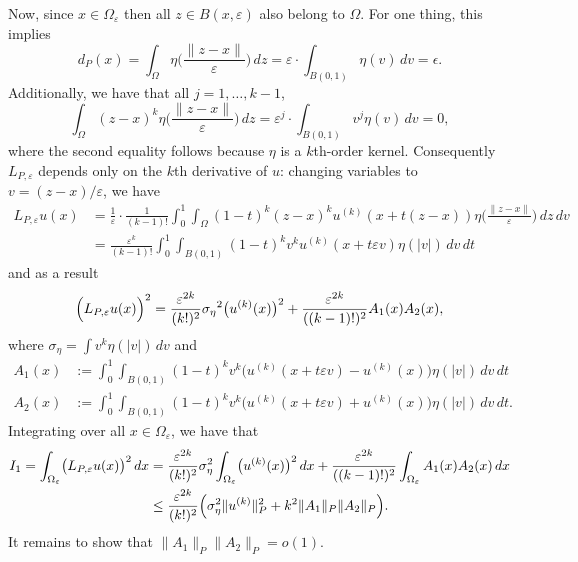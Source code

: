 \documentclass{article}
\newcommand{\1}{\mathbf{1}}
\theoremstyle{definition}
\theoremstyle{remark}
\begin{document}
Now, since $x \in \Omega_{\varepsilon}$ then all $z \in B(x,\varepsilon)$ also belong to $\Omega$. For one thing, this implies
\begin{equation*}
d_P(x) = \int_{\Omega} \eta\biggl(\frac{\|z - x\|}{\varepsilon}\biggr) \,dz = \varepsilon \cdot \int_{B(0,1)}  \eta(v) \,dv = \epsilon.
\end{equation*}
Additionally, we have that all $j = 1,\ldots,k - 1$, 
\begin{equation*}
\int_{\Omega}(z - x)^{k}\eta\biggl(\frac{\|z - x\|}{\varepsilon}\biggr) \,dz = \varepsilon^j \cdot \int_{B(0,1)} v^j \eta(v) \,dv = 0,
\end{equation*}
where the second equality follows because $\eta$ is a $k$th-order kernel. Consequently $L_{P,\varepsilon}$ depends only on the $k$th derivative of $u$: changing variables to $v = (z - x)/\varepsilon$, we have
\begin{align*}
L_{P,\varepsilon}u(x) & = \frac{1}{\varepsilon} \cdot \frac{1}{(k - 1)!} \int_{0}^{1} \int_{\Omega} (1 - t)^k (z - x)^k u^{(k)}(x + t(z - x)) \eta\biggl(\frac{\|z - x\|}{\varepsilon}\biggr) \,dz \,dv \\
& = \frac{\varepsilon^{k}}{(k - 1)!} \int_{0}^{1} \int_{B(0,1)} (1 - t)^k v^k u^{(k)}(x + t\varepsilon v) \eta(|v|) \,dv \,dt
\end{align*} 
and as a result
\begin{equation*}
\Bigl(L_{P,\varepsilon}u(x)\Bigr)^2 = \frac{\varepsilon^{2k}}{(k!)^2} {\sigma_\eta}^2 \bigl(u^{(k)}(x)\bigr)^2 + \frac{\varepsilon^{2k}}{((k - 1)!)^2}A_1(x)A_{2}(x),
\end{equation*}
where $\sigma_\eta = \int v^k \eta(|v|) \,dv$ and 
\begin{align*}
A_1(x) & := \int_{0}^{1} \int_{B(0,1)} (1 - t)^k v^k \bigl(u^{(k)}(x + t\varepsilon v) - u^{(k)}(x)\bigr) \eta(|v|) \,dv \,dt \\
A_2(x) & := \int_{0}^{1} \int_{B(0,1)} (1 - t)^k v^k \bigl(u^{(k)}(x + t\varepsilon v) + u^{(k)}(x)\bigr) \eta(|v|) \,dv \,dt.
\end{align*}
Integrating over all $x \in \Omega_{\varepsilon}$, we have that
\begin{align*}
I_1 = \int_{\Omega_{\varepsilon}} \bigl(L_{P,\varepsilon}u(x)\bigr)^2 \,dx & = \frac{\varepsilon^{2k}}{(k!)^2} \sigma_\eta^2 \int_{\Omega_{\varepsilon}} \bigl(u^{(k)}(x)\bigr)^2 \,dx + \frac{\varepsilon^{2k}}{((k - 1)!)^2} \int_{\Omega_{\varepsilon}}A_1(x) A_2(x) \,dx \\
& \leq \frac{\varepsilon^{2k}}{(k!)^2} \Bigl(\sigma_\eta^2 \|u^{(k)}\|_{P}^2 + k^2 \|A_1\|_P \|A_2\|_P\Bigr).
\end{align*}
It remains to show that $\|A_1\|_P\|A_2\|_P = o(1)$.
\end{document}
